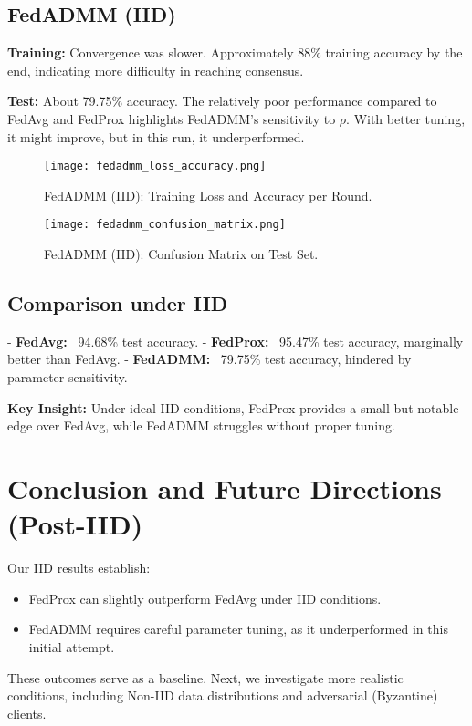 \documentclass[12pt,a4paper]{report}
\begin{document}
\section{FedADMM (IID)}

\textbf{Training:} Convergence was slower. Approximately 88\% training accuracy by the end, indicating more difficulty in reaching consensus.

\textbf{Test:} About 79.75\% accuracy. The relatively poor performance compared to FedAvg and FedProx highlights FedADMM’s sensitivity to $\rho$. With better tuning, it might improve, but in this run, it underperformed.

\begin{figure}[H]
	\centering
	\texttt{[image: fedadmm\_loss\_accuracy.png]}
	\caption{FedADMM (IID): Training Loss and Accuracy per Round.}
\end{figure}

\begin{figure}[H]
	\centering
	\texttt{[image: fedadmm\_confusion\_matrix.png]}
	\caption{FedADMM (IID): Confusion Matrix on Test Set.}
\end{figure}

\section{Comparison under IID}

- \textbf{FedAvg:} ~94.68\% test accuracy.
- \textbf{FedProx:} ~95.47\% test accuracy, marginally better than FedAvg.
- \textbf{FedADMM:} ~79.75\% test accuracy, hindered by parameter sensitivity.

\textbf{Key Insight:} Under ideal IID conditions, FedProx provides a small but notable edge over FedAvg, while FedADMM struggles without proper tuning.

\chapter{Conclusion and Future Directions (Post-IID)}

Our IID results establish:
\begin{itemize}
	\item FedProx can slightly outperform FedAvg under IID conditions.
	\item FedADMM requires careful parameter tuning, as it underperformed in this initial attempt.
\end{itemize}

These outcomes serve as a baseline. Next, we investigate more realistic conditions, including Non-IID data distributions and adversarial (Byzantine) clients.
\end{document}

